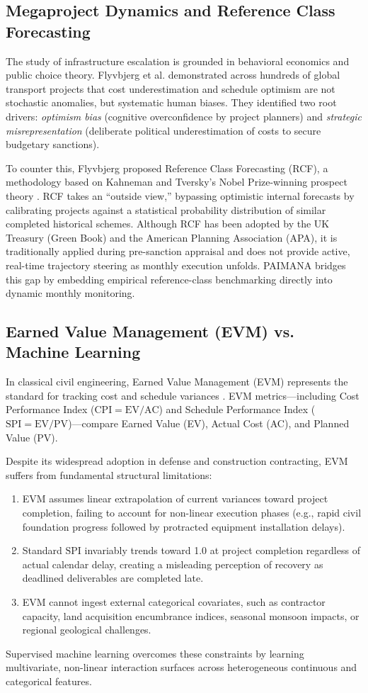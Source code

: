 \documentclass[conference]{IEEEtran}
\begin{document}
\subsection{Megaproject Dynamics and Reference Class Forecasting}
The study of infrastructure escalation is grounded in behavioral economics and public choice theory. Flyvbjerg et al. \cite{b1,b3} demonstrated across hundreds of global transport projects that cost underestimation and schedule optimism are not stochastic anomalies, but systematic human biases. They identified two root drivers: \textit{optimism bias} (cognitive overconfidence by project planners) and \textit{strategic misrepresentation} (deliberate political underestimation of costs to secure budgetary sanctions). 

To counter this, Flyvbjerg proposed Reference Class Forecasting (RCF), a methodology based on Kahneman and Tversky's Nobel Prize-winning prospect theory \cite{b4}. RCF takes an ``outside view,'' bypassing optimistic internal forecasts by calibrating projects against a statistical probability distribution of similar completed historical schemes. Although RCF has been adopted by the UK Treasury (Green Book) and the American Planning Association (APA), it is traditionally applied during pre-sanction appraisal and does not provide active, real-time trajectory steering as monthly execution unfolds. PAIMANA bridges this gap by embedding empirical reference-class benchmarking directly into dynamic monthly monitoring.

\subsection{Earned Value Management (EVM) vs. Machine Learning}
In classical civil engineering, Earned Value Management (EVM) represents the standard for tracking cost and schedule variances \cite{b5}. EVM metrics---including Cost Performance Index ($\text{CPI} = \text{EV}/\text{AC}$) and Schedule Performance Index ($\text{SPI} = \text{EV}/\text{PV}$)---compare Earned Value (EV), Actual Cost (AC), and Planned Value (PV). 

Despite its widespread adoption in defense and construction contracting, EVM suffers from fundamental structural limitations:
\begin{enumerate}
    \item EVM assumes linear extrapolation of current variances toward project completion, failing to account for non-linear execution phases (e.g., rapid civil foundation progress followed by protracted equipment installation delays).
    \item Standard $\text{SPI}$ invariably trends toward 1.0 at project completion regardless of actual calendar delay, creating a misleading perception of recovery as deadlined deliverables are completed late.
    \item EVM cannot ingest external categorical covariates, such as contractor capacity, land acquisition encumbrance indices, seasonal monsoon impacts, or regional geological challenges.
\end{enumerate}
Supervised machine learning overcomes these constraints by learning multivariate, non-linear interaction surfaces across heterogeneous continuous and categorical features.
\end{document}

